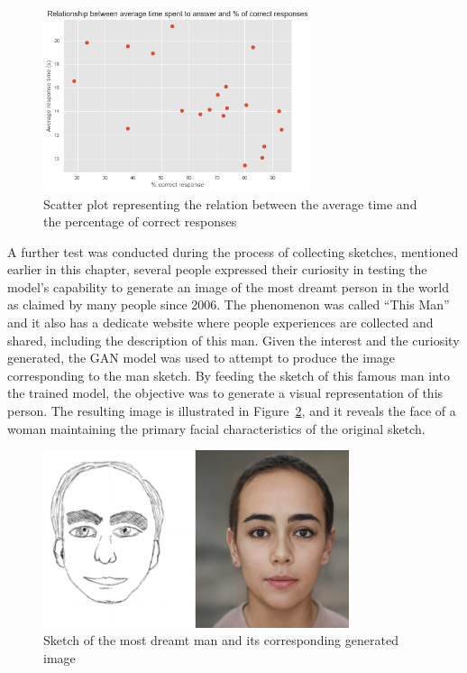\begin{figure}[!ht]
  \centering
  \includegraphics[width=0.7\textwidth]{figures/RISULTATI/relationshipTime-responses.png}
  \caption{Scatter plot representing the relation between the average time and the percentage of correct responses}
  \label{fig:scatter plot relation avg time and percentage of correct responses}
\end{figure}

\noindent A further test was conducted during the process of collecting sketches, mentioned earlier in this chapter, several people expressed their curiosity in testing the model's capability to generate an image of the most dreamt person in the world as claimed by many people since 2006.
The phenomenon was called “This Man” and it also has a dedicate website where people experiences are collected and shared, including the description of this man.
Given the interest and the curiosity generated, the GAN model was used to attempt to produce the image corresponding to the man sketch. By feeding the sketch of this famous man into the trained model, the objective was to generate a visual representation of this person. The resulting image is illustrated in Figure~\ref{fig:this man output}, and it reveals the face of a woman maintaining the primary facial characteristics of the original sketch.

\begin{figure}[!ht]
  \centering
  \includegraphics[width=0.8\textwidth]{figures/RISULTATI/thisMan-output.png}
  \caption{Sketch of the most dreamt man and its corresponding generated image}
  \label{fig:this man output}
\end{figure}